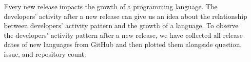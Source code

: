 



Every new release impacts the growth of a programming language. The developers' activity after a new release can give us an idea about the relationship between developers' activity pattern and the growth of a language. To observe the developers' activity pattern after a new release, we have collected all release dates of new languages from GitHub and then plotted them alongside question, issue, and repository count.

